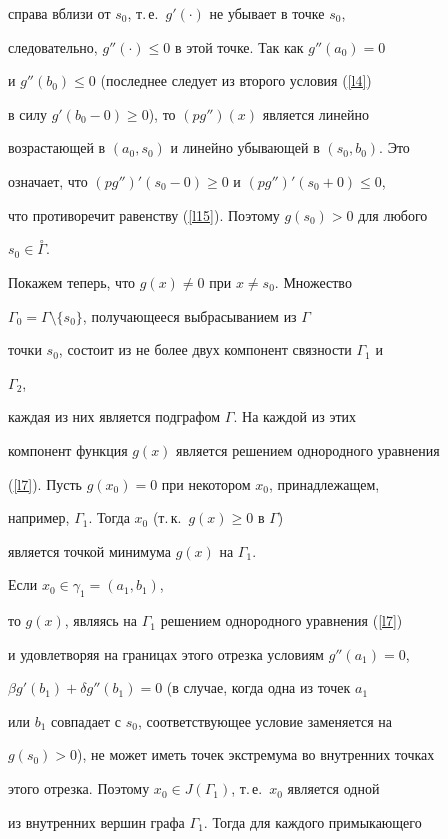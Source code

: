 {{{{{{{справа вблизи от $s_0$, т.\,е.~$g'(\cdot)$ не убывает в точке $s_0$,


следовательно, $g''(\cdot)\leq 0$ в этой точке. Так как $g''(a_0)= 0$


и $g''(b_0)\leq 0$ (последнее следует из второго условия (\ref{l4})


в силу $g'(b_0-0)\geq 0$), то $(pg'')(x)$ является линейно


возрастающей в $(a_0,s_0)$ и линейно убывающей в $(s_0,b_0)$. Это


означает, что $(pg'')'(s_0 -0)\geq 0$ и $(pg'')'(s_0 +0)\leq 0$,


что противоречит равенству (\ref{l15}). Поэтому $g(s_0)>0$ для любого


$s_0 \in \overset{\circ}{\Gamma}$.





Покажем теперь, что $g(x)\ne 0$ при $x \ne s_0$. Множество


$\Gamma_0=\Gamma\setminus \{s_0\}$, получающееся выбрасыванием из $\Gamma$


точки $s_0$, состоит из не более двух компонент связности $\Gamma_1$ и


$\Gamma_2$,


каждая из них является подграфом $\Gamma$. На каждой из этих


компонент функция $g(x)$ является решением однородного уравнения


(\ref{l7}). Пусть $g(x_0)=0$ при некотором $x_0$, принадлежащем,


например, $\Gamma_1$. Тогда $x_0$ (т.\,к.~$g(x)\geq 0$ в $\Gamma$)


является точкой минимума $g(x)$ на $\Gamma_1$.


Если $x_0 \in \gamma_1 = (a_1,b_1)$,


то $g(x)$, являясь на $\Gamma_1$ решением однородного уравнения (\ref{l7})


и удовлетворяя на границах этого отрезка условиям $g''(a_1)=0$,


$\beta g'(b_1)+\delta g''(b_1)=0$ (в случае, когда одна из точек $a_1$


или $b_1$ совпадает с $s_0$, соответствующее условие заменяется на


$g(s_0)>0$), не может иметь точек экстремума во внутренних точках


этого отрезка. Поэтому $x_0 \in J(\Gamma_1)$, т.\,е.~$x_0$ является одной


из внутренних вершин графа $\Gamma_1$. Тогда для каждого примыкающего


}}}}}}}
